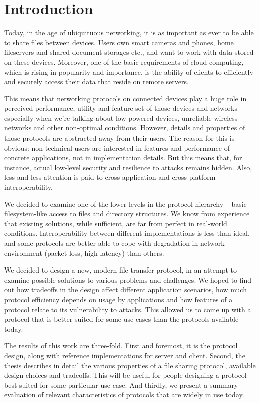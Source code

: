 \chapter*{Introduction}

Today, in the age of ubiquituous networking, it is as important as ever to be able to share files between
devices. Users own smart cameras and phones, home fileservers and shared document storages etc., and want to
work with data stored on these devices. Moreover, one of the basic requirements of cloud computing, which is
rising in popularity and importance, is the ability of clients to efficiently and securely access their data
that reside on remote servers.

This means that networking protocols on connected devices play a huge role in perceived performance, utility
and feature set of those devices and networks -- especially when we're talking about low-powered devices,
unreliable wireless networks and other non-optimal conditions. However, details and properties of those
protocols are abstracted away from their users. The reason for this is obvious: non-technical users are
interested in features and performance of concrete applications, not in implementation details. But this means
that, for instance, actual low-level security and resilience to attacks remains hidden. Also, less and less
attention is paid to cross-application and cross-platform interoperability.

We decided to examine one of the lower levels in the protocol hierarchy -- basic filesystem-like access to
files and directory structures. We know from experience that existing solutions, while sufficient, are
far from perfect in real-world conditions. Interoperability between different implementations is less than ideal,
and some protocols are better able to cope with degradation in network environment (packet loss, high latency)
than others.

We decided to design a new, modern file transfer protocol, in an attempt to examine possible solutions to
various problems and challenges. We hoped to find out how tradeoffs in the design affect different application
scenarios, how much protocol efficiency depends on usage by applications and how features of a protocol relate
to its vulnerability to attacks. This allowed us to come up with a protocol that is better suited for some
use cases than the protocols available today.

The results of this work are three-fold. First and foremost, it is the protocol design, along with reference
implementations for server and client. Second, the thesis describes in detail the various properties of a file
sharing protocol, available design choices and tradeoffs.  This will be useful for people designing a protocol
best suited for some particular use case. And thirdly, we present a summary evaluation of relevant
characteristics of protocols that are widely in use today.


